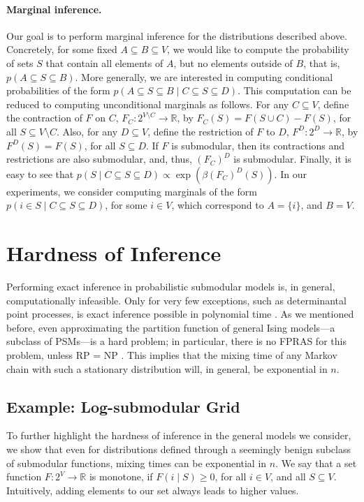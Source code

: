 \paragraph{Marginal inference.}
Our goal is to perform marginal inference for the distributions described above.
Concretely, for some fixed $A \subseteq B \subseteq V$, we would like to compute the probability of sets $S$ that contain all elements of $A$, but no elements outside of $B$, that is, $p(A \subseteq S \subseteq B)$.
More generally, we are interested in computing conditional probabilities of the form $p(A \subseteq S \subseteq B \mid C \subseteq S \subseteq D)$.
This computation can be reduced to computing unconditional marginals as follows.
For any $C \subseteq V$, define the contraction of $F$ on $C$, $F_C : 2^{V \setminus C} \to \mathbb{R}$, by $F_C(S) = F(S \cup C) - F(S)$, for all $S \subseteq V \setminus C$.
Also, for any $D \subseteq V$, define the restriction of $F$ to $D$, $F^D : 2^D \to \mathbb{R}$, by $F^D(S) = F(S)$, for all $S \subseteq D$.
If $F$ is submodular, then its contractions and restrictions are also submodular, and, thus, $(F_C)^D$ is submodular.
Finally, it is easy to see that $p(S \mid C \subseteq S \subseteq D) \propto \exp(\beta (F_C)^D(S))$.
In our experiments, we consider computing marginals of the form $p(i \in S \mid C \subseteq S \subseteq D)$, for some $i \in V$, which correspond to $A = \{i\}$, and $B = V$.

\section{Hardness of Inference}
Performing exact inference in probabilistic submodular models is, in general, computationally infeasible.
Only for very few exceptions, such as determinantal point processes, is exact inference possible in polynomial time \citep{kulesza12}.
As we mentioned before, even approximating the partition function of general Ising models---a subclass of PSMs---is a hard problem; in particular, there is no FPRAS for this problem, unless RP = NP \citep{jerrum93}.
This implies that the mixing time of any Markov chain with such a stationary distribution will, in general, be exponential in $n$.

\subsection{Example: Log-submodular Grid}
To further highlight the hardness of inference in the general models we consider, we show that even for distributions defined through a seemingly benign subclass of submodular functions, mixing times can be exponential in $n$.
We say that a set function $F : 2^V \to \mathbb{R}$ is monotone, if $F(i \mid S) \geq 0$, for all $i \in V$, and all $S \subseteq V$.
Intuitively, adding elements to our set always leads to higher values.


